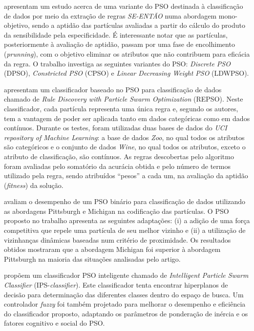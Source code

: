 \documentclass[
	12pt,				%
	openany,			%
	oneside,	
	a4paper,			%
	brazil,				%
	]{unimontes-ppgmsc-abntex2}
\begin{document}
 apresentam um estudo acerca de uma variante do PSO destinada à classificação de dados por meio da extração de regras {\em SE-ENTÃO} numa abordagem mono-objetivo, sendo a aptidão das partículas avaliadas a partir do cálculo do produto da sensibilidade pela especificidade. É interessante notar que as partículas, posteriormente à avaliação de aptidão, passam por uma fase de encolhimento ({\em prunning}), com o objetivo eliminar os atributos que não contribuem para eficácia da regra. O trabalho investiga as seguintes variantes do PSO: {\em Discrete PSO} (DPSO), {\em Constricted PSO} (CPSO) e {\em Linear Decreasing Weight PSO} (LDWPSO).

 apresentam um classificador baseado no PSO para classificação de dados chamado de {\em Rule Discovery with Particle Swarm Optimization} (REPSO). Neste classificador, cada partícula representa uma única regra e, segundo os autores, tem a vantagem de poder ser aplicada tanto em dados categóricas como em dados contínuos. Durante os testes, foram utilizadas duas bases de dados do {\em UCI repository of Machine Learning}: a base de dados {\em Zoo}, no qual todos os atributos são categóricos e o conjunto de dados {\em Wine}, no qual todos os atributos, exceto o atributo de classificação, são contínuos. As regras descobertas pelo algoritmo foram avaliadas pelo somatório da acurácia obtida e pelo número de termos utilizado pela regra, sendo atribuídos ``pesos'' a cada um, na avaliação da aptidão ({\em fitness}) da solução.

 avaliam o desempenho de um PSO binário para classificação de dados utilizando as abordagens Pittsburgh e Michigan na codificação das partículas. O PSO proposto no trabalho apresenta as seguintes adaptações: (i) a adição de uma força competitiva que repele uma partícula de seu melhor vizinho e (ii) a utilização de vizinhanças dinâmicas baseadas num critério de proximidade. Os resultados obtidos mostraram que a abordagem Michigan foi superior à abordagem Pittsburgh na maioria das situações analisadas pelo artigo.

 propõem um classificador PSO inteligente chamado de {\em Intelligent Particle Swarm Classifier} (IPS-{\em classifier}). Este classificador tenta encontrar hiperplanos de decisão para determinação das diferentes classes dentro do espaço de busca. Um controlador {\em fuzzy} foi também projetado para melhorar o desempenho e eficiência do classificador proposto, adaptando os parâmetros de ponderação de inércia e os fatores cognitivo e social do PSO. 
\end{document}
